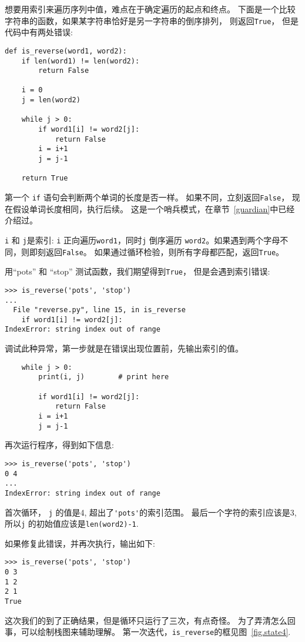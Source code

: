 \documentclass[10pt]{book}
\begin{document}
想要用索引来遍历序列中值，难点在于确定遍历的起点和终点。
下面是一个比较字符串的函数，如果某字符串恰好是另一字符串的倒序排列，
则返回{\tt True}， 但是代码中有两处错误:

\begin{verbatim}
def is_reverse(word1, word2):
    if len(word1) != len(word2):
        return False
    
    i = 0
    j = len(word2)

    while j > 0:
        if word1[i] != word2[j]:
            return False
        i = i+1
        j = j-1

    return True
\end{verbatim}
%
第一个 {\tt if} 语句会判断两个单词的长度是否一样。
如果不同，立刻返回{\tt False}，
现在假设单词长度相同，执行后续。
这是一个哨兵模式，在章节~\ref{guardian}中已经介绍过。

{\tt i} 和 {\tt j}是索引:  {\tt i} 正向遍历{\tt word1}，同时{\tt j} 倒序遍历
{\tt word2}。如果遇到两个字母不同，则即刻返回{\tt False}。
如果通过循环检验，则所有字母都匹配，返回{\tt True}。

用``pots'' 和 ``stop'' 测试函数，我们期望得到{\tt True}，
但是会遇到索引错误:

\begin{verbatim}
>>> is_reverse('pots', 'stop')
...
  File "reverse.py", line 15, in is_reverse
    if word1[i] != word2[j]:
IndexError: string index out of range
\end{verbatim}
%
调试此种异常，第一步就是在错误出现位置前，先输出索引的值。

\begin{verbatim}
    while j > 0:
        print(i, j)        # print here
        
        if word1[i] != word2[j]:
            return False
        i = i+1
        j = j-1
\end{verbatim}
%
再次运行程序，得到如下信息:

\begin{verbatim}
>>> is_reverse('pots', 'stop')
0 4
...
IndexError: string index out of range
\end{verbatim}
%
首次循环， {\tt j} 的值是4,
超出了\verb"'pots'"的索引范围。
最后一个字符的索引应该是3,
所以{\tt j} 的初始值应该是{\tt len(word2)-1}.

如果修复此错误，并再次执行，输出如下:

\begin{verbatim}
>>> is_reverse('pots', 'stop')
0 3
1 2
2 1
True
\end{verbatim}
%
这次我们的到了正确结果，但是循环只运行了三次，有点奇怪。
为了弄清怎么回事，可以绘制栈图来辅助理解。
第一次迭代，\verb"is_reverse"的框见图~\ref{fig.state4}.  
 
\end{document}
